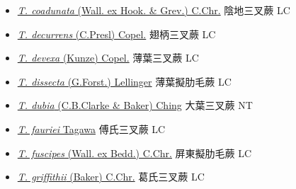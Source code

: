 \begin{itemize}
  \begin{itemize}
        \item[] \href{http://www.theplantlist.org/tpl1.1/search?q=Tectaria+coadunata}{\textit{T. coadunata} (Wall. ex Hook. \& Grev.) C.Chr.}   陰地三叉蕨 LC
        \item[] \href{http://www.theplantlist.org/tpl1.1/search?q=Tectaria+decurrens}{\textit{T. decurrens} (C.Presl) Copel.}   翅柄三叉蕨 LC
        \item[] \href{http://www.theplantlist.org/tpl1.1/search?q=Tectaria+devexa}{\textit{T. devexa} (Kunze) Copel.}   薄葉三叉蕨 LC
        \item[] \href{http://www.theplantlist.org/tpl1.1/search?q=Tectaria+dissecta}{\textit{T. dissecta} (G.Forst.) Lellinger}     薄葉擬肋毛蕨 LC
        \item[] \href{http://www.theplantlist.org/tpl1.1/search?q=Tectaria+dubia}{\textit{T. dubia} (C.B.Clarke \& Baker) Ching}   大葉三叉蕨 NT
        \item[] \href{http://www.theplantlist.org/tpl1.1/search?q=Tectaria+fauriei}{\textit{T. fauriei} Tagawa}   傅氏三叉蕨 LC
        \item[] \href{http://www.theplantlist.org/tpl1.1/search?q=Tectaria+fuscipes}{\textit{T. fuscipes} (Wall. ex Bedd.) C.Chr.}     屏東擬肋毛蕨 LC
        \item[] \href{http://www.theplantlist.org/tpl1.1/search?q=Tectaria+griffithii}{\textit{T. griffithii} (Baker) C.Chr.}     葛氏三叉蕨 LC

\end{itemize}
\end{itemize}
